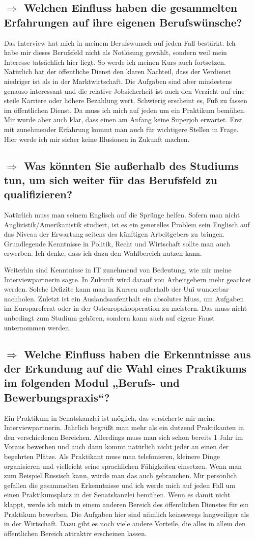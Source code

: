 \documentclass[12pt,headsepline,a4paper]{scrartcl}
\newcommand\quest[1]{\subsection*{$\Rightarrow$ #1}}
\begin{document}
\quest{Welchen Einfluss haben die gesammelten Erfahrungen auf ihre eigenen Berufswünsche?}
Das Interview hat mich in meinem Berufswunsch auf jeden Fall bestärkt. Ich habe mir dieses Berufsfeld nicht als Notlösung gewählt, sondern weil mein Interesse tatsächlich hier liegt. So werde ich meinen Kurs auch fortsetzen. Natürlich hat der öffentliche Dienst den klaren Nachteil, dass der Verdienst niedriger ist als in der  Marktwirtschaft. Die Aufgaben sind aber mindestens genauso interessant und die relative Jobsicherheit ist auch den Verzicht auf eine steile Karriere oder höhere Bezahlung wert. Schwierig erscheint es, Fuß zu fassen im öffentlichen Dienst. Da muss ich mich auf jeden um ein Praktikum bemühen.
Mir wurde aber auch klar, dass einen am Anfang keine Superjob erwartet. Erst mit zunehmender Erfahrung kommt man auch für wichtigere Stellen in Frage. Hier werde ich mir sicher keine Illusionen in Zukunft machen.

\quest{Was könnten Sie außerhalb des Studiums tun, um sich weiter für das Berufsfeld zu qualifizieren?}
Natürlich muss man seinem Englisch  auf die Sprünge helfen. Sofern man nicht Anglizistik/Amerikanistik studiert, ist es ein generelles Problem sein Englisch auf das Niveau der Erwartung seitens des künftigen Arbeitgebers zu bringen. 
Grundlegende Kenntnisse in Politik, Recht und Wirtschaft sollte man auch erwerben. Ich denke, dass ich dazu den Wahlbereich nutzen kann.

Weiterhin sind Kenntnisse in IT zunehmend von Bedeutung, wie mir meine Interviewpartnerin sagte. In Zukunft wird darauf von Arbeitgebern mehr geachtet werden. Solche Defizite kann man in Kursen außerhalb der Uni wunderbar nachholen.
Zuletzt ist ein Auslandsaufenthalt ein absolutes Muss, um Aufgaben im Europareferat oder in der Osteuropakooperation zu meistern. Das muss nicht unbedingt zum Studium gehören, sondern kann auch auf eigene Faust unternommen werden.

\quest{Welche Einfluss haben die Erkenntnisse aus der Erkundung auf die Wahl eines Praktikums im folgenden Modul „Berufs- und Bewerbungspraxis“?}
Ein Praktikum in Senatskanzlei ist möglich, das versicherte mir meine Interviewpartnerin. Jährlich begrüßt man mehr als ein dutzend Praktikanten in den verschiedenen Bereichen.
Allerdings muss man sich schon bereits 1 Jahr im Voraus bewerben und auch dann kommt natürlich nicht jeder an einen der begehrten Plätze. Als Praktikant muss man telefonieren, kleinere Dinge organisieren und vielleicht seine sprachlichen Fähigkeiten einsetzen. Wenn man zum Beispiel Russisch kann, würde man das auch gebrauchen.
Mir persönlich gefallen die gesammelten Erkenntnisse und ich werde mich auf jeden Fall um einen Praktikumsplatz in der Senatskanzlei bemühen. Wenn es damit nicht klappt, werde ich mich in einem anderen Bereich des  öffentlichen Dienstes für ein Praktikum bewerben. Die Aufgaben hier sind nämlich keineswegs langweiliger als in der Wirtschaft. Dazu gibt es noch viele andere Vorteile, die alles in allem den öffentlichen  Bereich attraktiv erscheinen lassen.
\end{document}
